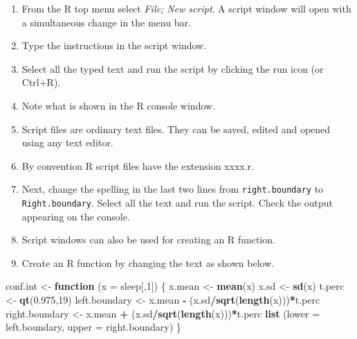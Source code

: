 \documentclass[
]{book}
\newenvironment{Shaded}{\begin{snugshade}}{\end{snugshade}}
\newcommand{\AttributeTok}[1]{\textcolor[rgb]{0.13,0.29,0.53}{#1}}
\newcommand{\ControlFlowTok}[1]{\textcolor[rgb]{0.13,0.29,0.53}{\textbf{#1}}}
\newcommand{\DecValTok}[1]{\textcolor[rgb]{0.00,0.00,0.81}{#1}}
\newcommand{\FloatTok}[1]{\textcolor[rgb]{0.00,0.00,0.81}{#1}}
\newcommand{\FunctionTok}[1]{\textcolor[rgb]{0.13,0.29,0.53}{\textbf{#1}}}
\newcommand{\NormalTok}[1]{#1}
\newcommand{\OtherTok}[1]{\textcolor[rgb]{0.56,0.35,0.01}{#1}}
\newcommand{\SpecialCharTok}[1]{\textcolor[rgb]{0.81,0.36,0.00}{\textbf{#1}}}
\providecommand{\tightlist}{%
  \setlength{\itemsep}{0pt}\setlength{\parskip}{0pt}}
\begin{document}
\begin{enumerate}
\def\labelenumi{(\alph{enumi})}
\tightlist
\item
  From the R top menu select \emph{File; New script}. A script window will open with a simultaneous change in the menu bar.
\item
  Type the instructions in the script window.
\item
  Select all the typed text and run the script by clicking the run icon (or Ctrl+R).
\item
  Note what is shown in the R console window.
\item
  Script files are ordinary text files. They can be saved, edited and opened using any text editor.
\item
  By convention R script files have the extension {xxxx.r}.
\item
  Next, change the spelling in the last two lines from \texttt{right.boundary} to \texttt{Right.boundary}. Select all the text and run the script. Check the output appearing on the console.
\item
  Script windows can also be used for creating an R function.
\item
  Create an R function by changing the text as shown below.
\end{enumerate}

\begin{Shaded}
\begin{Highlighting}[]
\NormalTok{conf.int }\OtherTok{\textless{}{-}} \ControlFlowTok{function}\NormalTok{ (}\AttributeTok{x =}\NormalTok{ sleep[,}\DecValTok{1}\NormalTok{])}
\NormalTok{\{}
\NormalTok{  x.mean }\OtherTok{\textless{}{-}} \FunctionTok{mean}\NormalTok{(x)   }
\NormalTok{  x.sd }\OtherTok{\textless{}{-}} \FunctionTok{sd}\NormalTok{(x)    }
\NormalTok{  t.perc }\OtherTok{\textless{}{-}} \FunctionTok{qt}\NormalTok{(}\FloatTok{0.975}\NormalTok{,}\DecValTok{19}\NormalTok{) }
\NormalTok{  left.boundary }\OtherTok{\textless{}{-}}\NormalTok{ x.mean }\SpecialCharTok{{-}}\NormalTok{ (x.sd}\SpecialCharTok{/}\FunctionTok{sqrt}\NormalTok{(}\FunctionTok{length}\NormalTok{(x)))}\SpecialCharTok{*}\NormalTok{t.perc }
\NormalTok{  right.boundary }\OtherTok{\textless{}{-}}\NormalTok{ x.mean }\SpecialCharTok{+}\NormalTok{ (x.sd}\SpecialCharTok{/}\FunctionTok{sqrt}\NormalTok{(}\FunctionTok{length}\NormalTok{(x)))}\SpecialCharTok{*}\NormalTok{t.perc}
  \FunctionTok{list}\NormalTok{ (}\AttributeTok{lower =}\NormalTok{ left.boundary, }\AttributeTok{upper =}\NormalTok{ right.boundary)  }
\NormalTok{\}}
\end{Highlighting}
\end{Shaded}
\end{document}
